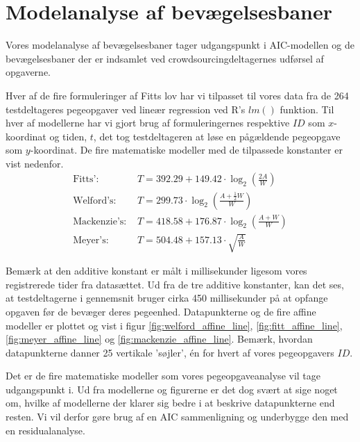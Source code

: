 \section*{Modelanalyse af bevægelsesbaner}
Vores modelanalyse af bevægelsesbaner tager udgangspunkt i AIC-modellen og de bevægelsesbaner der er indsamlet ved crowdsourcingdeltagernes udførsel af opgaverne.

Hver af de fire formuleringer af Fitts lov har vi tilpasset til vores data fra de 264 testdeltageres pegeopgaver ved lineær regression ved R's $lm()$ funktion. Til hver af modellerne har vi gjort brug af formuleringernes respektive $ID$ som $x$-koordinat og tiden, $t$, det tog testdeltageren at løse en pågældende pegeopgave som $y$-koordinat. De fire matematiske modeller med de tilpassede konstanter er vist nedenfor.
\begin{align*}
\text{Fitts': } &T = 392.29 + 149.42\cdot \log_2\left(\frac{2A}{W}\right)\\
\text{Welford's: } &T =  299.73\cdot \log_2\left(\frac{A+\frac{1}{2}W}{W}\right)\\
\text{Mackenzie's: } &T = 418.58 + 176.87\cdot \log_2\left(\frac{A+W}{W}\right)\\
\text{Meyer's: } &T = 504.48 + 157.13 \cdot \sqrt{\frac{A}{W}}
\end{align*}

Bemærk at den additive konstant er målt i millisekunder ligesom vores registrerede tider fra datasættet. Ud fra de tre additive konstanter, kan det ses, at testdeltagerne i gennemsnit bruger cirka 450 millisekunder på at opfange opgaven før de bevæger deres pegeenhed. Datapunkterne og de fire affine modeller er plottet og vist i figur \ref{fig:welford_affine_line}, \ref{fig:fitt_affine_line}, \ref{fig:meyer_affine_line} og \ref{fig:mackenzie_affine_line}. Bemærk, hvordan datapunkterne danner 25 vertikale 'søjler', én for hvert af vores pegeopgavers $ID$.

Det er de fire matematiske modeller som vores pegeopgaveanalyse vil tage udgangspunkt i. Ud fra modellerne og figurerne er det dog svært at sige noget om, hvilke af modellerne der klarer sig bedre i at beskrive datapunkterne end resten. Vi vil derfor gøre brug af en AIC sammenligning og underbygge den med en residualanalyse.


